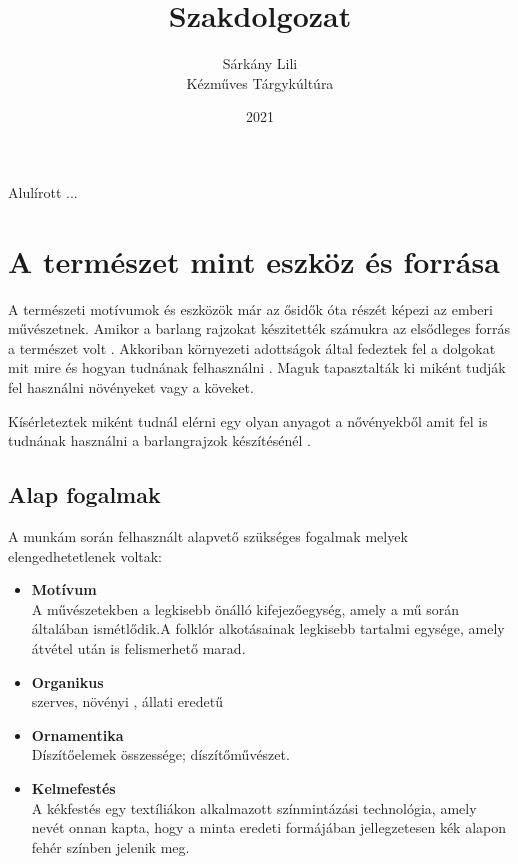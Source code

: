 \documentclass[fontsize=12pt, appendixprefix=true]{scrreprt}
\author{Sárkány Lili\\Kézműves Tárgykúltúra}
\title{Szakdolgozat}
\date{2021}
\newcommand{\pushtobottom}{\vspace*{\fill}}
\newcommand{\signatureline}[1]{\begin{flushright}
	\vspace*{.5cm}\par\noindent\makebox[2.5in]{\hrulefill}
	\par\noindent\makebox[2.5in][c]{#1}
	\end{flushright}
}
\begin{document}
\maketitle

Alulírott ...
\pushtobottom
\signatureline{Aláírás}

\tableofcontents
%

\chapter{A természet mint eszköz és forrása}
A természeti motívumok és eszközök már az ősidők óta részét képezi az emberi művészetnek. \cite{domonkos1981magyarorszagi} Amikor a barlang rajzokat készitették számukra
az elsődleges forrás a természet volt  .
 \cite{tiborindigokemia} 
Akkoriban környezeti adottságok által fedeztek fel a dolgokat mit mire és hogyan tudnának felhasználni .
 Maguk tapasztalták ki miként tudják fel használni  növényeket vagy a köveket.
 
 Kísérleteztek miként tudnál elérni egy olyan anyagot a nővényekből amit fel is tudnának használni a barlangrajzok készítésénél .



 


\section{Alap fogalmak}
A munkám során felhasznált  alapvető szükséges fogalmak melyek elengedhetetlenek voltak:
\begin{itemize}
	\item \textbf{Motívum} \\  A művészetekben a legkisebb önálló kifejezőegység, amely a mű során általában ismétlődik.A folklór alkotásainak legkisebb tartalmi egysége, amely átvétel után is felismerhető marad.
	\item \textbf{Organikus} \\ szerves, növényi , állati eredetű
	\item \textbf{Ornamentika} \\ Díszítőelemek összessége; díszítőművészet.
	\item \textbf{Kelmefestés} \\ A kékfestés egy textíliákon alkalmazott színmintázási technológia, amely nevét onnan kapta, hogy a minta eredeti formájában jellegzetesen kék alapon fehér színben jelenik meg.
	\end{itemize}
\end{document}
